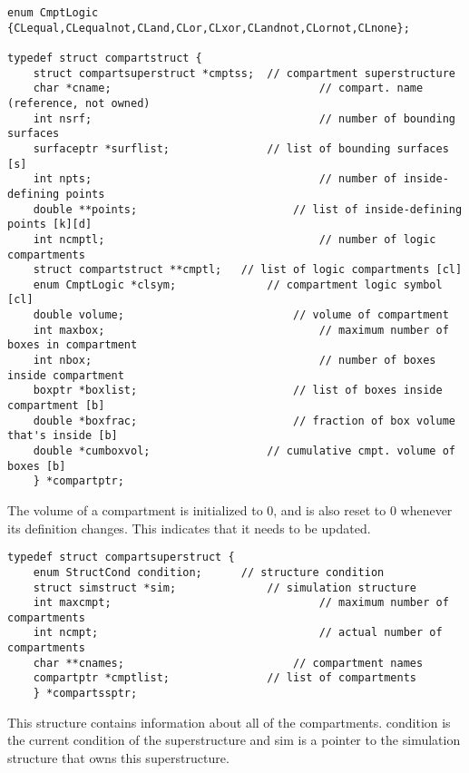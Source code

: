 \documentclass {scrbook}
\begin{document}
\begin{lstlisting}
enum CmptLogic {CLequal,CLequalnot,CLand,CLor,CLxor,CLandnot,CLornot,CLnone};

typedef struct compartstruct {
	struct compartsuperstruct *cmptss;	// compartment superstructure
	char *cname;								// compart. name (reference, not owned)
	int nsrf;									// number of bounding surfaces
	surfaceptr *surflist;				// list of bounding surfaces [s]
	int npts;									// number of inside-defining points
	double **points;						// list of inside-defining points [k][d]
	int ncmptl;									// number of logic compartments
	struct compartstruct **cmptl;	// list of logic compartments [cl]
	enum CmptLogic *clsym;				// compartment logic symbol [cl]
	double volume;							// volume of compartment
	int maxbox;									// maximum number of boxes in compartment
	int nbox;									// number of boxes inside compartment
	boxptr *boxlist;						// list of boxes inside compartment [b]
	double *boxfrac;						// fraction of box volume that's inside [b]
	double *cumboxvol;					// cumulative cmpt. volume of boxes [b]
	} *compartptr;
\end{lstlisting}

The volume of a compartment is initialized to 0, and is also reset to 0 whenever its definition changes. This indicates that it needs to be updated.

\begin{lstlisting}
typedef struct compartsuperstruct {
	enum StructCond condition;		// structure condition
	struct simstruct *sim;				// simulation structure
	int maxcmpt;								// maximum number of compartments
	int ncmpt;									// actual number of compartments
	char **cnames;							// compartment names
	compartptr *cmptlist;				// list of compartments
	} *compartssptr;
\end{lstlisting}

This structure contains information about all of the compartments. condition is the current condition of the superstructure and sim is a pointer to the simulation structure that owns this superstructure.
\end{document}
